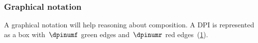 \begin{example}
    \begin{comment}
        
        \begin{table}[tbh]
            \begin{center}
                \begin{tabular}{cccc}
                    Technology & Specific energy [\unitfrac[]{J}{kg}] & Specific cost [\unitfrac[]{J}{\stdcurr}]
                    & Life [\# cycles]
                    \\
                    \hline
                    $\mathsf{NiMH}$  & 100.0 & 3.41 & 500    \\
                    $\mathsf{NiH2}$  & 45.0  & 10.5 & 20,000 \\
                    $\mathsf{LCO}$   & 195.0 & 2.84 & 750    \\
                    $\mathsf{LMO}$   & 150.0 & 2.84 & 500    \\
                    $\mathsf{NiCad}$ & 30.0  & 7.50 & 500    \\
                    $\mathsf{SLA}$   & 30.0  & 7.00 & 500    \\
                    $\mathsf{LiPo}$  & 250.0 & 2.50 & 600    \\
                    $\mathsf{LFP}$   & 90.0  & 1.50 & 1,500
                \end{tabular}
            \end{center}
            \caption{Specifications of common battery technologies~\cite{censi2015}. }
            \label{tab:battery}
        \end{table}
    \end{comment}

\end{example}




\FloatBarrier

\subsubsection{Graphical notation}

A graphical notation will help reasoning about composition.
A DPI is represented as a box with~$\dpinumf$ green edges and~$\dpinumr$ red edges~(\cref{fig:dp_graphical}).

\begin{figure}[h]
    \centering
    \caption{}
    \label{fig:dp_graphical}
\end{figure}

